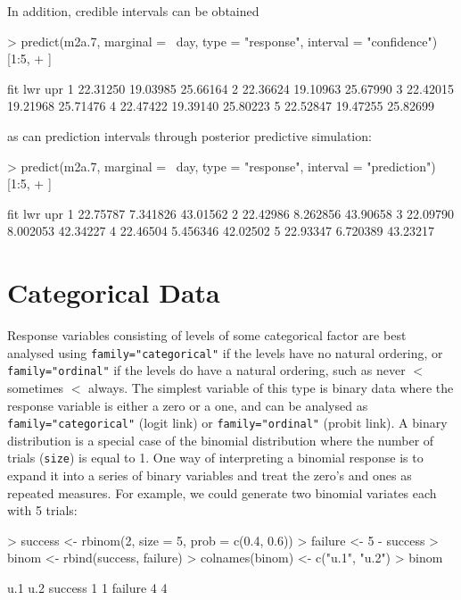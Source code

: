 \documentclass{article}
\begin{document}
In addition, credible intervals can be obtained 

\begin{Schunk}
\begin{Sinput}
> predict(m2a.7, marginal = ~day, type = "response", interval = "confidence")[1:5, 
+     ]
\end{Sinput}
\begin{Soutput}
       fit      lwr      upr
1 22.31250 19.03985 25.66164
2 22.36624 19.10963 25.67990
3 22.42015 19.21968 25.71476
4 22.47422 19.39140 25.80223
5 22.52847 19.47255 25.82699
\end{Soutput}
\end{Schunk}

as can prediction intervals through posterior predictive simulation:

\begin{Schunk}
\begin{Sinput}
> predict(m2a.7, marginal = ~day, type = "response", interval = "prediction")[1:5, 
+     ]
\end{Sinput}
\begin{Soutput}
       fit      lwr      upr
1 22.75787 7.341826 43.01562
2 22.42986 8.262856 43.90658
3 22.09790 8.002053 42.34227
4 22.46504 5.456346 42.02502
5 22.93347 6.720389 43.23217
\end{Soutput}
\end{Schunk}


\section{Categorical Data}
\label{cat-sec}

Response variables consisting of levels of some categorical factor are best analysed using \texttt{family="categorical"} if the levels have no natural ordering,  or \texttt{family="ordinal"} if the levels do have a natural ordering, such as never $<$ sometimes $<$ always. The simplest variable of this type is binary data where the response variable is either a zero or a one, and can be analysed as \texttt{family="categorical"} (logit link) or \texttt{family="ordinal"} (probit link).   A binary distribution is a special case of the binomial distribution where the number of trials (\texttt{size}) is equal to 1. One way of interpreting a binomial response is to expand it into a series of binary variables and treat the zero's and ones as repeated measures. For example, we could generate two binomial variates each with 5 trials:


\begin{Schunk}
\begin{Sinput}
> success <- rbinom(2, size = 5, prob = c(0.4, 0.6))
> failure <- 5 - success
> binom <- rbind(success, failure)
> colnames(binom) <- c("u.1", "u.2")
> binom
\end{Sinput}
\begin{Soutput}
        u.1 u.2
success   1   1
failure   4   4
\end{Soutput}
\end{Schunk}
\end{document}

